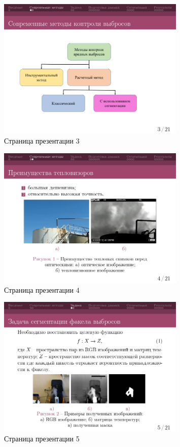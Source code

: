 \documentclass[14pt, a4paper]{extreport}
\begin{document}
	\begin{figure}[h!]
		\centering
		\includegraphics[width = 0.8\textwidth]{image/процентовка1_page-0003}	
		\caption{Страница презентации 3}
	\end{figure}
	\begin{figure}[h!]
		\centering
		\includegraphics[width = 0.8\textwidth]{image/процентовка1_page-0004}	
		\caption{Страница презентации 4}
	\end{figure}
	\begin{figure}[h!]
		\centering
		\includegraphics[width = 0.8\textwidth]{image/процентовка1_page-0005}	
		\caption{Страница презентации 5}
	\end{figure}
\end{document}
